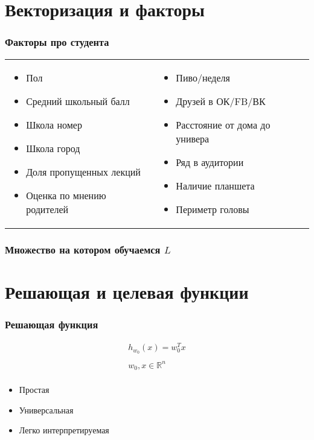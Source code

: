 \documentclass[14pt, fleqn, xcolor={dvipsnames, table}, hyperref={unicode}, babel={english,russian}, inputenc=utf8x]{beamer}
\begin{document}
\section{Векторизация и факторы}
\begin{frame}
\frametitle{Факторы про студента}
\small
\begin{center}
\begin{tabular}{p{}p{}}
\begin{itemize}
  \item Пол
  \item Средний школьный балл
  \item Школа номер
  \item Школа город
  \item Доля пропущенных лекций
  \item Оценка по мнению родителей
\end{itemize} &
\begin{itemize}
  \item Пиво/неделя
  \item Друзей в ОК/FB/ВК
  \item Расстояние от дома до универа
  \item Ряд в аудитории
  \item Наличие планшета
  \item Периметр головы
\end{itemize}
\end{tabular}
\end{center}
\end{frame}
\begin{frame}[t]\frametitle{Множество на котором обучаемся $L$}
\tiny
    \DTLsetseparator{,}
    \renewcommand\dtlstringalign{p{4.5em}}
    \renewcommand\dtlrealalign{p{1.5em}}
    \renewcommand\dtlintalign{p{1.5em}}
    \renewcommand\dtldisplayvalign{c}
    \renewcommand\dtldisplayafterhead{\hline\\}
    \renewcommand\dtlheaderformat[1]{\textbf{#1}}
    
\end{frame}

\section{Решающая и целевая функции}
\begin{frame}[t]\frametitle{Решающая функция}
    $$\begin{array}{c}
      h_{w_0}(x) = w_0^{T}x \\
      \\
      w_0, x \in \mathbb{R}^n \\
      \end{array}
    $$
\begin{itemize}
  \item Простая
  \item Универсальная
  \item Легко интерпретируемая
\end{itemize}
\end{frame}
\end{document}
